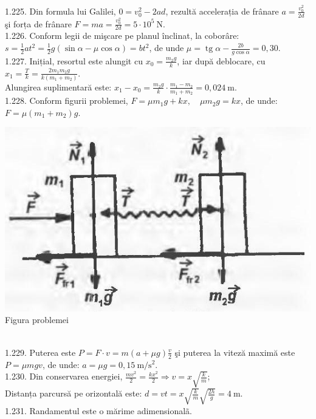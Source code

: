 1.225. Din formula lui Galilei, $0=v_{0}^{2}-2 a d$, rezultă accelerația de frânare $a=\frac{v_{0}^{2}}{2 d}$ şi forța de frânare $F=m a=\frac{v_{0}^{2}}{2 d}=5 \cdot 10^{5} \mathrm{~N}$.\\

1.226. Conform legii de mişcare pe planul înclinat, la coborâre:\\ $s=\frac{1}{2} a t^{2}=\frac{1}{2} g(\sin \alpha-\mu \cos \alpha)=b t^{2}$, de unde $\mu=\operatorname{tg} \alpha-\frac{2 b}{g \cos \alpha}=0,30$.\\

1.227. Inițial, resortul este alungit cu $x_{0}=\frac{m_{2} g}{k}$, iar după deblocare, cu $x_{1}=\frac{T}{k}=\frac{2 m_{1} m_{2} g}{k\left(m_{1}+m_{2}\right)}$.\\ Alungirea suplimentară este: $x_{1}-x_{0}=\frac{m_{2} g}{k} \cdot \frac{m_{1}-m_{2}}{m_{1}+m_{2}}=0,024 \mathrm{~m}$.\\

1.228. Conform figurii problemei, $F=\mu m_{1} g+k x, \quad \mu m_{2} g=k x$, de unde:\\ $F=\mu\left(m_{1}+m_{2}\right) g$.\\ \begin{center} \includegraphics[width=0.4\linewidth]{images/2025_07_01_5b3ff9fa0d508c8e9f17g-247}\\ Figura problemei \end{center}\\

1.229. Puterea este $P=F \cdot v=m(a+\mu g) \frac{v}{2}$ şi puterea la viteză maximă este $P=\mu m g v$, de unde: $a=\mu g=0,15 \mathrm{~m} / \mathrm{s}^{2}$.\\

1.230. Din conservarea energiei, $\frac{m v^{2}}{2}=\frac{k x^{2}}{2} \Rightarrow v=x \sqrt{\frac{k}{m}}$;\\ Distanța parcursă pe orizontală este: $d=v t=x \sqrt{\frac{k}{m}} \sqrt{\frac{2 h}{g}}=4 \mathrm{~m}$.\\

1.231. Randamentul este o mărime adimensionalã.\\

